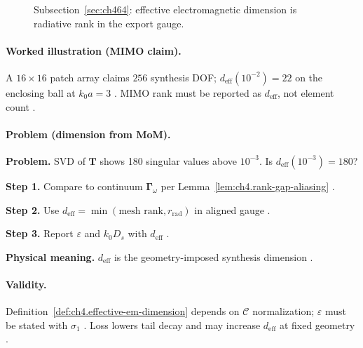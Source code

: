 \begin{figure}[t]
\centering
{}
\caption{Subsection~\ref{sec:ch464}: effective electromagnetic dimension is radiative rank in the export gauge.}
\label{fig:ch4.effective-em-dimension}
\end{figure}

\paragraph{Worked illustration (MIMO claim).}
A \(16\times16\) patch array claims \(256\) synthesis DOF; \(d_{\mathrm{eff}}(10^{-2})=22\) on the enclosing ball at \(k_{0}a=3\)
\cite{harrington2001,collin2001,hansen1988}. MIMO rank must be reported as \(d_{\mathrm{eff}}\), not element count \cite{devaney2004}.

\paragraph{Problem (dimension from MoM).}
\textbf{Problem.} SVD of \(\mathbf{T}\) shows 180 singular values above \(10^{-3}\). Is \(d_{\mathrm{eff}}(10^{-3})=180\)?

\textbf{Step 1.} Compare to continuum \(\boldsymbol{\Gamma}_\omega\) per Lemma~\ref{lem:ch4.rank-gap-aliasing} \cite{harrington2001}.

\textbf{Step 2.} Use \(d_{\mathrm{eff}}=\min(\text{mesh rank},r_{\mathrm{rad}})\) in aligned gauge \cite{devaney2004,hansen1988}.

\textbf{Step 3.} Report \(\varepsilon\) and \(k_{0}D_{s}\) with \(d_{\mathrm{eff}}\) \cite{stratton1941}.

\textbf{Physical meaning.} \(d_{\mathrm{eff}}\) is the geometry-imposed synthesis dimension \cite{hansen1988}.

\paragraph{Validity.}
Definition~\ref{def:ch4.effective-em-dimension} depends on \(\mathcal{C}\) normalization; \(\varepsilon\) must be stated with \(\sigma_{1}\)
\cite{hansen1988,stratton1941}. Loss lowers tail decay and may increase \(d_{\mathrm{eff}}\) at fixed geometry \cite{harrington2001}.


